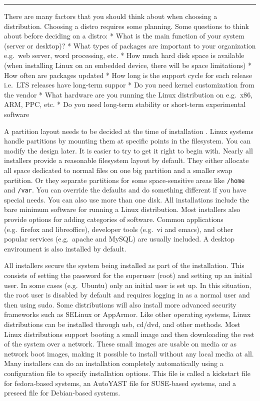 \begin{center}\rule{3in}{0.4pt}\end{center}

There are many factors that you should think about when choosing a
distribution. Choosing a distro requires some planning. Some questions
to think about before deciding on a distro: * What is the main function
of your system (server or desktop)? * What types of packages are
important to your organization e.g.~web server, word processing, etc. *
How much hard disk space is available (when installing Linux on an
embedded device, there will be space limitations) * How often are
packages updated * How long is the support cycle for each release
i.e.~LTS releases have long-term suppor * Do you need kernel
customization from the vendor * What hardware are you running the Linux
distribution on e.g.~x86, ARM, PPC, etc. * Do you need long-term
stability or short-term experimental software

A partition layout needs to be decided at the time of installation .
Linux systems handle partitions by mounting them at specific points in
the filesystem. You can modify the design later. It is easier to try to
get it right to begin with. Nearly all installers provide a reasonable
filesystem layout by default. They either allocate all space dedicated
to normal files on one big partition and a smaller swap partition. Or
they separate partitions for some space-sensitive areas like
\texttt{/home} and \texttt{/var}. You can override the defaults and do
something different if you have special needs. You can also use more
than one disk. All installations include the bare minimum software for
running a Linux distribution. Most installers also provide options for
adding categories of software. Common applications (e.g.~firefox and
libreoffice), developer tools (e.g.~vi and emacs), and other popular
services (e.g.~apache and MySQL) are usually included. A desktop
environment is also installed by default.

All installers secure the system being installed as part of the
installation. This consists of setting the password for the superuser
(root) and setting up an initial user. In some cases (e.g.~Ubuntu) only
an initial user is set up. In this situation, the root user is disabled
by default and requires logging in as a normal user and then using sudo.
Some distributions will also install more advanced security frameworks
such as SELinux or AppArmor. Like other operating systems, Linux
distributions can be installed through usb, cd/dvd, and other methods.
Most Linux distributions support booting a small image and then
downloading the rest of the system over a network. These small images
are usable on media or as network boot images, making it possible to
install without any local media at all. Many installers can do an
installation completely automatically using a configuration file to
specify installation options. This file is called a kickstart file for
fedora-based systems, an AutoYAST file for SUSE-based systems, and a
preseed file for Debian-based systems.


